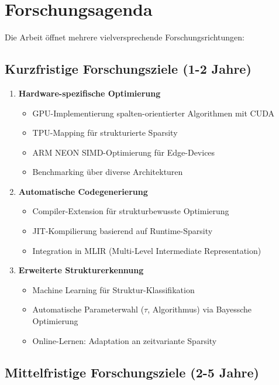 ﻿\documentclass[a4paper,12pt]{report}
\theoremstyle{definition}
\begin{document}
	\section{Forschungsagenda}
	
	Die Arbeit öffnet mehrere vielversprechende Forschungsrichtungen:
	
	\subsection{Kurzfristige Forschungsziele (1-2 Jahre)}
	
	\begin{enumerate}
		\item \textbf{Hardware-spezifische Optimierung}
		\begin{itemize}
			\item GPU-Implementierung spalten-orientierter Algorithmen mit CUDA
			\item TPU-Mapping für strukturierte Sparsity
			\item ARM NEON SIMD-Optimierung für Edge-Devices
			\item Benchmarking über diverse Architekturen
		\end{itemize}
		
		\item \textbf{Automatische Codegenerierung}
		\begin{itemize}
			\item Compiler-Extension für strukturbewusste Optimierung
			\item JIT-Kompilierung basierend auf Runtime-Sparsity
			\item Integration in MLIR (Multi-Level Intermediate Representation)
		\end{itemize}
		
		\item \textbf{Erweiterte Strukturerkennung}
		\begin{itemize}
			\item Machine Learning für Struktur-Klassifikation
			\item Automatische Parameterwahl ($\tau$, Algorithmus) via Bayessche Optimierung
			\item Online-Lernen: Adaptation an zeitvariante Sparsity
		\end{itemize}
	\end{enumerate}
	
	\subsection{Mittelfristige Forschungsziele (2-5 Jahre)}
	
\end{document}
